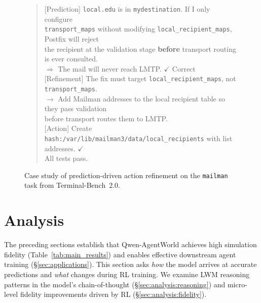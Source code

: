 \documentclass{llmxive}
\providecommand{\method}{Qwen-AgentWorld\xspace}
\begin{document}
\begin{figure}[t]
\begin{tcolorbox}[
  colback=gray!3, colframe=black!50, boxrule=0.5pt,
  title={\textbf{Case Study: Accurate Environment Prediction Enables Action Refinement}},
  fonttitle=\bfseries\small, boxrule=0.5pt, arc=2pt
]
\vspace{4pt}

\begin{tcolorbox}[colback=caseafter!5!white, colframe=caseafter, boxrule=0.4pt, arc=1pt, title={\textbf{After LWM RL}}, fonttitle=\small]

\begin{quote}
\ttfamily\scriptsize
[Prediction] \texttt{local.edu} is in \texttt{mydestination}. If I only configure\\
\texttt{transport\_maps} without modifying \texttt{local\_recipient\_maps}, Postfix will reject\\
the recipient at the validation stage \textbf{before} transport routing is ever consulted.\\
$\Rightarrow$ The mail will never reach LMTP. $\checkmark$ Correct\\[4pt]
[Refinement] The fix must target \texttt{local\_recipient\_maps}, not \texttt{transport\_maps}.\\
\hspace{0.5cm} $\rightarrow$ Add Mailman addresses to the local recipient table so they pass validation\\
\hspace{0.5cm} before transport routes them to LMTP.\\[4pt]
[Action] Create \texttt{hash:/var/lib/mailman3/data/local\_recipients} with list addresses. $\checkmark$\\
All tests pass.
\end{quote}
\end{tcolorbox}

\end{tcolorbox}

\caption{Case study of prediction-driven action refinement on the \texttt{mailman} task from Terminal-Bench~2.0.}
\label{fig:case-prediction-refine}
\end{figure}














\section{Analysis}
\label{sec:analysis}

The preceding sections establish that \method achieves high simulation fidelity (Table~\ref{tab:main_results}) and enables effective downstream agent training (\S\ref{sec:applications}).
This section asks \emph{how} the model arrives at accurate predictions and \emph{what} changes during RL training.
We examine LWM reasoning patterns in the model's chain-of-thought (\S\ref{sec:analysis:reasoning}) and micro-level fidelity improvements driven by RL (\S\ref{sec:analysis:fidelity}).
\end{document}
